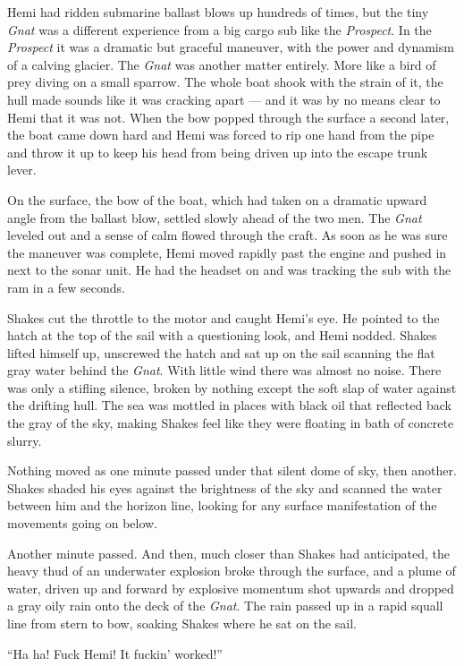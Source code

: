 \documentclass[
]{scrbook}
\begin{document}
Hemi had ridden submarine ballast blows up hundreds of times, but the
tiny \emph{Gnat} was a different experience from a big cargo sub like
the \emph{Prospect}. In the \emph{Prospect} it was a dramatic but
graceful maneuver, with the power and dynamism of a calving glacier. The
\emph{Gnat} was another matter entirely. More like a bird of prey diving
on a small sparrow. The whole boat shook with the strain of it, the hull
made sounds like it was cracking apart --- and it was by no means clear
to Hemi that it was not. When the bow popped through the surface a
second later, the boat came down hard and Hemi was forced to rip one
hand from the pipe and throw it up to keep his head from being driven up
into the escape trunk lever.

On the surface, the bow of the boat, which had taken on a dramatic
upward angle from the ballast blow, settled slowly ahead of the two men.
The \emph{Gnat} leveled out and a sense of calm flowed through the
craft. As soon as he was sure the maneuver was complete, Hemi moved
rapidly past the engine and pushed in next to the sonar unit. He had the
headset on and was tracking the sub with the ram in a few seconds.

Shakes cut the throttle to the motor and caught Hemi's eye. He pointed
to the hatch at the top of the sail with a questioning look, and Hemi
nodded. Shakes lifted himself up, unscrewed the hatch and sat up on the
sail scanning the flat gray water behind the \emph{Gnat}. With little
wind there was almost no noise. There was only a stifling silence,
broken by nothing except the soft slap of water against the drifting
hull. The sea was mottled in places with black oil that reflected back
the gray of the sky, making Shakes feel like they were floating in bath
of concrete slurry.

Nothing moved as one minute passed under that silent dome of sky, then
another. Shakes shaded his eyes against the brightness of the sky and
scanned the water between him and the horizon line, looking for any
surface manifestation of the movements going on below.

Another minute passed. And then, much closer than Shakes had
anticipated, the heavy thud of an underwater explosion broke through the
surface, and a plume of water, driven up and forward by explosive
momentum shot upwards and dropped a gray oily rain onto the deck of the
\emph{Gnat}. The rain passed up in a rapid squall line from stern to
bow, soaking Shakes where he sat on the sail.

``Ha ha! Fuck Hemi! It fuckin' worked!''
\end{document}
